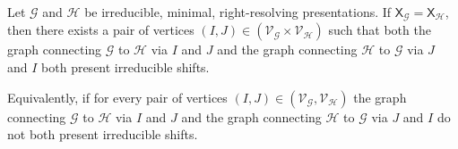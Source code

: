 \documentclass[hidelinks]{article}
\newcommand{\Gc}{\mathcal{G}}  %
\newcommand{\Hc}{\mathcal{H}}  %
\newcommand{\Vc}{\mathcal{V}}
\newcommand{\shift}[1]{\mathsf{X}_{#1}}
\theoremstyle{definition}
\begin{document}
    \begin{theorem}
        Let \(\Gc\) and \(\Hc\) be irreducible, minimal, right-resolving presentations. 
        If \(\shift{\Gc} = \shift{\Hc}\), then there exists a pair
        of vertices \((I, J) \in (\Vc_\Gc \times \Vc_\Hc)\) such that both the graph connecting \(\Gc\) to \(\Hc\) via 
        \(I\) and \(J\) and the graph connecting \(\Hc\) to \(\Gc\) via \(J\) and \(I\) both 
        present irreducible shifts.

        Equivalently, if for every pair of vertices \((I, J) \in (\Vc_\Gc, \Vc_\Hc)\) 
        the graph connecting \(\Gc\) to \(\Hc\) via \(I\) and \(J\) 
        and the graph connecting \(\Hc\) to \(\Gc\) via \(J\) and \(I\)
        do not both present irreducible shifts.
    \end{theorem}
\end{document}
